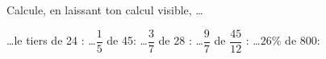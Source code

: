 %
%
Calcule, en laissant ton calcul visible, \dots
  \begin{tasks}
    \task \dots le tiers de 24 :
    \task \dots $\dfrac{1}{5}$ de 45:
    \task \dots $\dfrac{3}{7}$ de 28 :
    \task \dots $\dfrac{9}{7}$ de $\dfrac{45}{12}$ :
    \task \dots $26\%$ de 800:
  \end{tasks}
